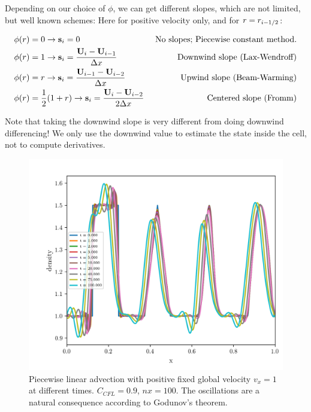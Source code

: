 Depending on our choice of $\phi$, we can get different slopes, which are not limited, but well known schemes:
Here for positive velocity only, and for $r = r_{i-1/2}$:

\begin{align}
	\phi(r) & = 0 \rightarrow \mathbf{s}_i = 0 
		&\text{ No slopes; Piecewise constant method.}\\
	\phi(r) & = 1 \rightarrow \mathbf{s}_i = \frac{\mathbf{U}_{i} - \mathbf{U}_{i-1}}{\Delta x} 
		&\text{ Downwind slope (Lax-Wendroff)} \\
	\phi(r) & = r \rightarrow \mathbf{s}_i = \frac{\mathbf{U}_{i-1} - \mathbf{U}_{i-2}}{\Delta x} 
		&\text{Upwind slope (Beam-Warming)} \\
	\phi(r) & = \frac{1}{2} (1 + r) \rightarrow \mathbf{s}_i = \frac{\mathbf{U}_{i} - \mathbf{U}_{i-2}}{2 \Delta x} 
		&\text{ Centered slope (Fromm)} \\
\end{align}



Note that taking the downwind slope is very different from doing downwind differencing!
We only use the downwind value to estimate the state inside the cell, not to compute derivatives.




\begin{figure}
	\centering
	\includegraphics[width=.9\textwidth]{./figures/advection-pwlin-four-shapes.png}%
	\caption{
		\label{fig:advection-pwlin-four-shapes-fixed-positive-vel}
		Piecewise linear advection with positive fixed global velocity $v_x = 1$ at different times. 
		$C_{CFL} = 0.9$,  $nx = 100$.
		The oscillations are a natural consequence according to Godunov's theorem.
	}
\end{figure}





